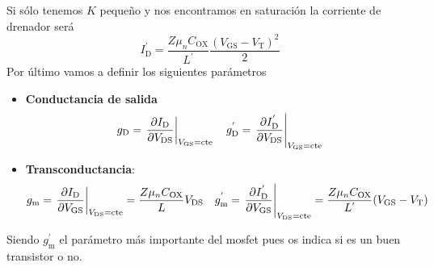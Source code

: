 Si sólo tenemos $K$ pequeño y nos encontramos en saturación la corriente de drenador será
\begin{equation}
    I^{'}_\mathrm{D}=\frac{Z\mu_nC_\mathrm{OX}}{L^{'}} \frac{(V_\mathrm{GS}-V_\mathrm{T})^2}{2}
    \label{eq: Corriente de drenador para K pequeño en saturaicon}
\end{equation}
Por último vamos a definir los siguientes parámetros
\begin{itemize}
    \item \textbf{Conductancia de salida} 
    \begin{equation}
        g_\mathrm{D}= \left. \pdiff[]{I_\mathrm{D}}{V_\mathrm{DS}} \right |_{V_\mathrm{GS}=\mathrm{cte}} \quad g^{'}_\mathrm{D}= \left. \pdiff[]{I^{'}_\mathrm{D}}{V_\mathrm{DS}} \right |_{V_\mathrm{GS}=\mathrm{cte}}
        \label{eq: conductancia de salida}
    \end{equation}
    \item \textbf{Transconductancia}:
    \begin{equation}
        g_\mathrm{m}=\left. \pdiff[]{I_\mathrm{D}}{V_\mathrm{GS}} \right |_{V_\mathrm{DS}=\mathrm{cte}}=\frac{Z\mu_nC_\mathrm{OX}}{L}V_\mathrm{DS} \quad g^{'}_\mathrm{m}= \left. \pdiff[]{I^{'}_\mathrm{D}}{V_\mathrm{GS}} \right |_{V_\mathrm{DS}=\mathrm{cte}}=\frac{Z\mu_nC_\mathrm{OX}}{L^{'}}(V_\mathrm{GS}-V_\mathrm{T})
    \end{equation}
\end{itemize}
Siendo $g^{'}_\mathrm{m}$ el parámetro más importante del mosfet pues os indica si es un buen transistor o no.
